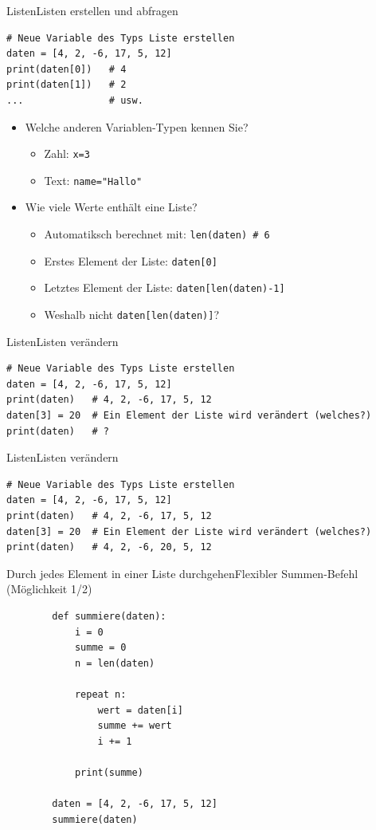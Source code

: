 \begin{frame}[fragile]{Listen}{Listen erstellen und abfragen}
\begin{lstlisting}
# Neue Variable des Typs Liste erstellen
daten = [4, 2, -6, 17, 5, 12] 
print(daten[0])   # 4
print(daten[1])   # 2
...               # usw.
\end{lstlisting}

\begin{itemize}[<+->]
\item Welche anderen Variablen-Typen kennen Sie?
\begin{itemize}
\item Zahl: \lstinline|x=3|
\item Text: \lstinline|name="Hallo"|
\end{itemize}
\item Wie viele Werte enthält eine Liste?
\begin{itemize}
\item Automatiksch berechnet mit: \lstinline|len(daten) # 6|
\item Erstes Element der Liste: \lstinline|daten[0]|
\item Letztes Element der Liste: \lstinline|daten[len(daten)-1]|
\item Weshalb nicht \lstinline|daten[len(daten)]|?
\end{itemize}
\end{itemize}
\end{frame}

\begin{frame}[fragile]{Listen}{Listen verändern}
\begin{lstlisting}
# Neue Variable des Typs Liste erstellen
daten = [4, 2, -6, 17, 5, 12] 
print(daten)   # 4, 2, -6, 17, 5, 12
daten[3] = 20  # Ein Element der Liste wird verändert (welches?)
print(daten)   # ?
\end{lstlisting}
\end{frame}

\begin{frame}[fragile]{Listen}{Listen verändern}
\begin{lstlisting}
# Neue Variable des Typs Liste erstellen
daten = [4, 2, -6, 17, 5, 12] 
print(daten)   # 4, 2, -6, 17, 5, 12
daten[3] = 20  # Ein Element der Liste wird verändert (welches?)
print(daten)   # 4, 2, -6, 20, 5, 12
\end{lstlisting}
\end{frame}


\begin{frame}[fragile]{Durch jedes Element in einer Liste durchgehen}{Flexibler Summen-Befehl (Möglichkeit 1/2)}
	\begin{lstlisting}
		def summiere(daten):
			i = 0
			summe = 0
			n = len(daten)
			
			repeat n:
				wert = daten[i]
				summe += wert
				i += 1
			
			print(summe)
			
		daten = [4, 2, -6, 17, 5, 12] 
		summiere(daten)
	\end{lstlisting}
\end{frame}


